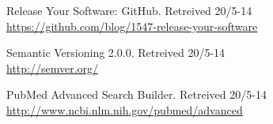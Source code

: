  Release Your Software: GitHub. Retreived 20/5-14\\
\url{https://github.com/blog/1547-release-your-software}

 Semantic Versioning 2.0.0. Retreived 20/5-14\\
\url{http://semver.org/}

 PubMed Advanced Search Builder. Retreived 20/5-14\\
\url{http://www.ncbi.nlm.nih.gov/pubmed/advanced}